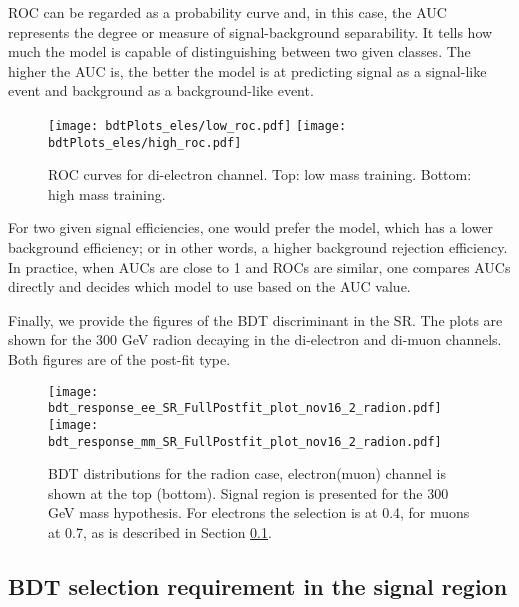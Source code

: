 ROC can be regarded as a probability curve and, in this case, the AUC represents the degree or measure of signal-background separability. It tells how much the model is capable of distinguishing between two given classes. The higher the AUC is, the better the model is at predicting signal as a signal-like event and background as a background-like event.

\begin{figure}[H]
\begin{center}
\texttt{[image: bdtPlots\_eles/low\_roc.pdf]}
\texttt{[image: bdtPlots\_eles/high\_roc.pdf]}
\caption[ROC curves for di-electron channel.]{ ROC curves for di-electron channel. Top: low mass training. Bottom: high mass training. }
\label{fig:ele_ROCs}
\end{center}
\end{figure}

For two given signal efficiencies, one would prefer the model, which has a lower background efficiency; or in other words, a higher background rejection efficiency. In practice, when AUCs are close to 1 and ROCs are similar, one compares AUCs directly and decides which model to use based on the AUC value. 

Finally, we provide the figures of the BDT discriminant in the SR. The plots are shown for the 300 GeV radion decaying in the di-electron and di-muon channels. Both figures are of the post-fit type.

\begin{figure}[H]
\begin{center}
\texttt{[image: bdt\_response\_ee\_SR\_FullPostfit\_plot\_nov16\_2\_radion.pdf]}\\
\texttt{[image: bdt\_response\_mm\_SR\_FullPostfit\_plot\_nov16\_2\_radion.pdf]}\\
\caption[BDT distributions for the radion case.]{ BDT distributions for the radion case, electron(muon) channel is shown at the top (bottom). Signal region is presented for the 300 GeV mass hypothesis. For electrons the selection is at 0.4, for muons at 0.7, as is described in Section \ref{BDT_selection_in_SR}.}
\label{fig:BDTs}
\end{center}
\end{figure}

\subsection{BDT selection requirement in the signal region}
\label{BDT_selection_in_SR}

